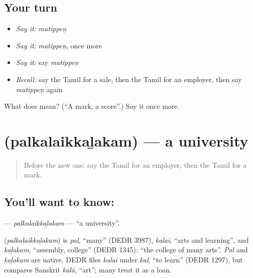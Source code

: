 \subsection*{Your turn}
\begin{itemize}
\raggedright
  \item \emph{Say it:} \emph{matippeṇ}
  \item \emph{Say it:} \emph{matippeṇ}, once more
  \item \emph{Say it:} say \emph{matippeṇ}
  \item \emph{Recall:} say the Tamil for a sale, then the Tamil for an employer, then say \emph{matippeṇ} again
\end{itemize}

\begin{tcolorbox}[breakable,colback=teal!4,colframe=teal!35!black,title={Before you move on}]
What does  mean? (\textquotedblleft{}A mark, a score\textquotedblright{}.) Say it once more.
\end{tcolorbox}
\section[\texorpdfstring{\ta{பல்கலைக்கழகம்} (palkalaikkaḻakam)}{பல்கலைக்கழகம் (palkalaikkaḻakam)}]{ (palkalaikkaḻakam) — a university}

\label{lesson:TA-C252-palkalaikkalakam}



\begin{quote}
Before the new one: say the Tamil for an employer, then the Tamil for a mark.
\end{quote}

\subsection*{You'll want to know: }
\textbf{} — \emph{palkalaikkaḻakam} — \textquotedblleft{}a university\textquotedblright{}.

\begin{cousinweb}
\textbf{} (\emph{palkalaikkaḻakam}) is \emph{pal}, \textquotedblleft{}many\textquotedblright{} (DEDR 3987), \emph{kalai}, \textquotedblleft{}arts and learning\textquotedblright{}, and \emph{kaḻakam}, \textquotedblleft{}assembly, college\textquotedblright{} (DEDR 1345): \textquotedblleft{}the college of many arts\textquotedblright{}. \emph{Pal} and \emph{kaḻakam} are native. DEDR files \emph{kalai} under \emph{kal}, \textquotedblleft{}to learn\textquotedblright{} (DEDR 1297), but compares Sanskrit \emph{kalā}, \textquotedblleft{}art\textquotedblright{}; many treat it as a loan.
\end{cousinweb}

